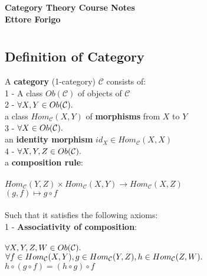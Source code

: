 \documentclass[a4paper, twoside, english, 11pt]{book}
\newcommand{\C}{\mathcal C}
\begin{document}
\pagestyle{headings}

\frontmatter

\begin{titlepage}
	\begin{center}
		{\huge \bfseries Category Theory Course Notes \\}
		\vspace{1.5cm}
		{\Large \bfseries Ettore Forigo}
	\end{center}
\end{titlepage}

\mainmatter

\chapter{}



\section{Definition of Category}

A \textbf{category} (1-category) $\C$ consists of: \\

1 - A class $Ob(\C)$ of objects of $\C$ \\

2 - $\forall X, Y \in Ob(\C) \ldotp$ \\
\indent\indent
a class $Hom_\C(X, Y)$ of \textbf{morphisms} from $X$ to $Y$ \\

3 - $\forall X \in Ob(\C) \ldotp$ \\
\indent\indent
an \textbf{identity morphism} $id_X \in Hom_\C(X, X)$ \\

4 - $\forall X, Y, Z \in Ob(\C) \ldotp$ \\
\indent\indent
a \textbf{composition rule}: \\\\
\indent\indent\indent
$Hom_\C(Y, Z) \times Hom_\C(X, Y) \rightarrow Hom_\C(X, Z)$ \\
\indent\indent\indent
$(g, f) \mapsto g \circ f$ \\\\

\noindent
Such that it satisfies the following axioms: \\

1 - \textbf{Associativity of composition}: \\\\
\indent\indent
$\forall X, Y, Z, W \in Ob(\C) \ldotp$ \\
\indent\indent
$\forall f \in Hom_\C(X, Y), g \in Hom_\C(Y, Z), h \in Hom_\C(Z, W) \ldotp$ \\
\indent\indent
$h \circ (g \circ f) = (h \circ g) \circ f$ \\
\end{document}
